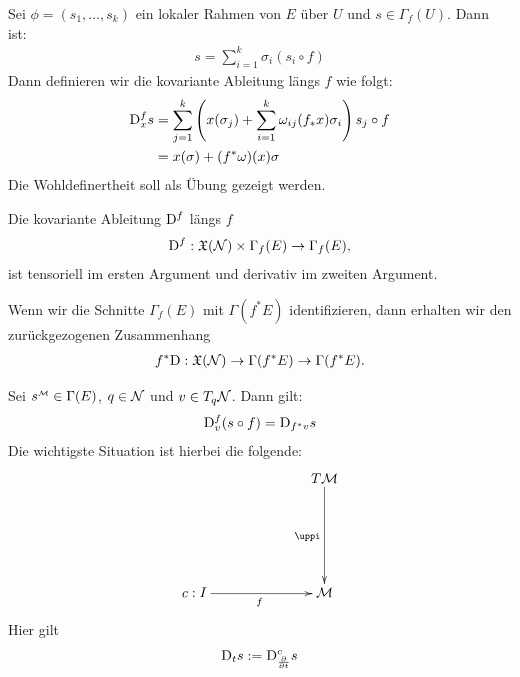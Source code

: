 \begin{defs}
Sei $\phi = (s_1, \dots, s_k)$ ein lokaler Rahmen von $E$ über $U$ und $s \in \Gamma_f (U)$. 
Dann ist:
\begin{align}
s = \sum^{k}_{i=1} \sigma_i (s_i \circ f)
\end{align}
Dann definieren wir die kovariante Ableitung längs $f$ wie folgt:
\begin{align}
\mathrm{D}^{f}_x s &= \sum^k_{j=1} \left( x(\sigma_j) + \sum^k_{i=1} \omega_{ij}(f_\ast x)\sigma_i \right) s_j \circ f\\
&= x(\sigma) + (f^\ast \omega)(x) \sigma
\end{align}
Die Wohldefinertheit soll als Übung gezeigt werden.
\end{defs}
\begin{satz}
Die kovariante Ableitung $\mathrm{D}^f$ längs $f$
\begin{align}
\mathrm{D}^f: \mathfrak{X}(\mathcal{N}) \times \Gamma_f (E) \to \Gamma_f (E),
\end{align}
ist tensoriell im ersten Argument und derivativ im zweiten Argument.
\end{satz}
Wenn wir die Schnitte $\Gamma_f (E)$ mit $\Gamma(f^\ast E)$ identifizieren, dann erhalten wir den zurückgezogenen Zusammenhang
\begin{align}
f^\ast \mathrm{D} : \mathfrak{X}(\mathcal{N}) \to \Gamma(f^\ast E) \to \Gamma(f^\ast E).
\end{align}

\begin{satz}
Sei $s^\text{{\begin{tiny}$\mfk$\end{tiny}}} \in \Gamma(E)$, $q \in \mathcal{N}$ und $v\in T_q \mathcal{N}$.
Dann gilt:
\begin{align}
\mathrm{D}^f_v (s\circ f) = \mathrm{D}_{f^\ast v} s
\end{align}
Die wichtigste Situation ist hierbei die folgende:
\begin{align}
\begin{xy}
  \xymatrix@=0.2\linewidth{
          &   T\mfk \ar[d]_{\pi} \\
      c : I  \ar[r]_f  &   \mfk
  }
\end{xy}
\end{align}
Hier gilt
\begin{align}
\mathrm{D}_t s := \mathrm{D}^c_{\pdv{t}} s
\end{align}
\end{satz}

